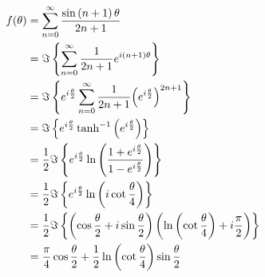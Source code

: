 \item

\begin{align*}
	f(\theta)
	 & = \sum_{n = 0}^\infty \frac{\sin \left(n + 1\right) \theta}{2n + 1}                                                                                             \\
	 & = \Im \left\{ \sum_{n = 0}^\infty \frac{1}{2n + 1} e^{i (n + 1) \theta} \right\}                                                                                \\
	 & = \Im \left\{ e^{i \frac{\theta}{2}} \sum_{n = 0}^\infty \frac{1}{2n + 1} {\left( e^{i \frac{\theta}{2}} \right)}^{2n + 1} \right\}                             \\
	 & = \Im \left\{ e^{i \frac{\theta}{2}} \tanh^{-1} \left( e^{i \frac{\theta}{2}} \right) \right\}                                                                  \\
	 & = \frac{1}{2} \Im \left\{ e^{i \frac{\theta}{2}} \ln \left( \frac{1 + e^{i \frac{\theta}{2}}}{1 - e^{i \frac{\theta}{2}}} \right) \right\}                            \\
	 & = \frac{1}{2} \Im \left\{ e^{i \frac{\theta}{2}} \ln \left( i \cot \frac{\theta}{4} \right) \right\}                                                                  \\
	 & = \frac{1}{2} \Im \left\{ \left( \cos \frac{\theta}{2} + i \sin \frac{\theta}{2} \right) \left( \ln \left( \cot \frac{\theta}{4} \right) + i \frac{\pi}{2} \right) \right\} \\
	 & = \frac{\pi}{4} \cos \frac{\theta}{2} + \frac{1}{2} \ln \left( \cot \frac{\theta}{4} \right) \sin \frac{\theta}{2}
\end{align*}
